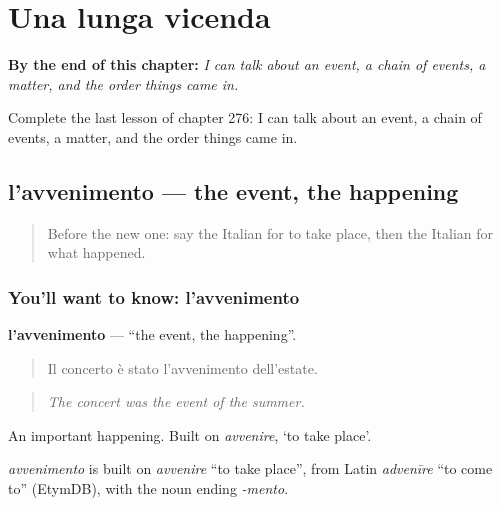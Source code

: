 
\chapter{Una lunga vicenda}
\label{ch:it-una-lunga-vicenda}

\begin{chapteropening}
\textbf{By the end of this chapter:} \emph{I can talk about an event, a chain of events, a matter, and the order things came in.}

Complete the last lesson of chapter 276: I can talk about an event, a chain of events, a matter, and the order things came in.
\end{chapteropening}

\section[l'avvenimento]{l'avvenimento — the event, the happening}

\label{lesson:IT-C276-avvenimento}



\begin{quote}
Before the new one: say the Italian for to take place, then the Italian for what happened.
\end{quote}

\subsection*{You'll want to know: l'avvenimento}
\textbf{l'avvenimento} — \textquotedblleft{}the event, the happening\textquotedblright{}.

\begin{quote}
Il concerto è stato l'avvenimento dell'estate.
\end{quote}

\begin{quote}
\emph{The concert was the event of the summer.}
\end{quote}

An important happening. Built on \emph{avvenire}, ‘to take place’.

\begin{cousinweb}
\emph{avvenimento} is built on \emph{avvenire} \textquotedblleft{}to take place\textquotedblright{}, from Latin \emph{advenīre} \textquotedblleft{}to come to\textquotedblright{} (EtymDB), with the noun ending \emph{-mento}.
\end{cousinweb}

